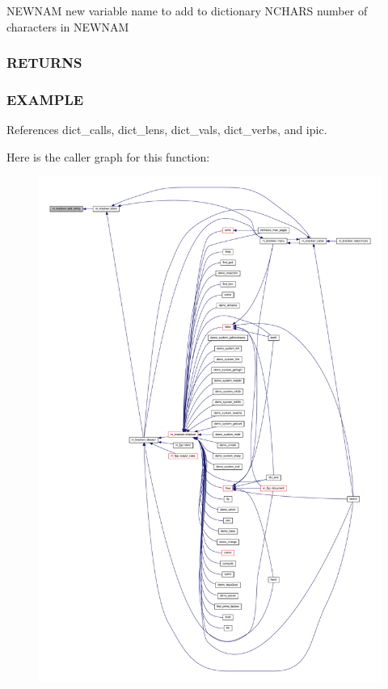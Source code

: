 N\+E\+W\+N\+AM new variable name to add to dictionary N\+C\+H\+A\+RS number of characters in N\+E\+W\+N\+AM

\subsubsection*{R\+E\+T\+U\+R\+NS}

\subsubsection*{E\+X\+A\+M\+P\+LE}

References dict\+\_\+calls, dict\+\_\+lens, dict\+\_\+vals, dict\+\_\+verbs, and ipic.

Here is the caller graph for this function\+:
\nopagebreak
\begin{figure}[H]
\begin{center}
\leavevmode
\includegraphics[width=350pt]{namespacem__kracken_a21998bf9ab683f8fb661f4f4b916c21f_icgraph}
\end{center}
\end{figure}
\mbox{\label{namespacem__kracken_af9225957a50e8e0559605911c4c5ee02}} 
